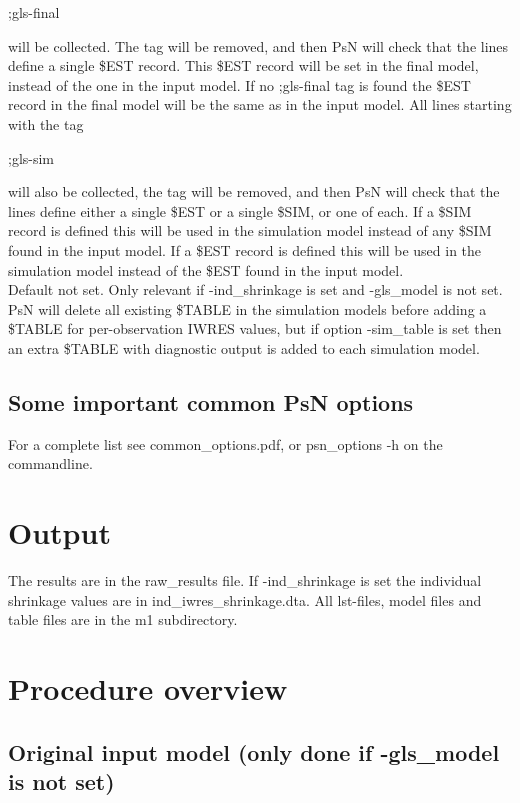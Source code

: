 \begin{optionlist}
;gls-final

will be collected. The tag will be removed, and then PsN will check that the lines define a single \$EST record. This \$EST record will be set in the final 
model, instead of the one in the input model. If no ;gls-final tag is found the \$EST record in the final model will be the same as in the input model. 
All lines starting with the tag

;gls-sim

will also be collected, the tag will be removed, and then PsN will check that the lines define either a single \$EST or a single \$SIM, or one of each. 
If a \$SIM record is defined this will be used in the simulation model instead of any \$SIM found in the input model. If a \$EST record is defined this 
will be used in the simulation model instead of the \$EST found in the input model.\\
\nextopt
{}
Default not set. Only relevant if -ind\_shrinkage is set and -gls\_model is not set. PsN will delete all existing \$TABLE in the simulation models before 
adding a \$TABLE for per-observation IWRES values, but if option -sim\_table is set then an extra \$TABLE with diagnostic output is added to each 
simulation model. 
\nextopt
\end{optionlist}

\subsection{Some important common PsN options}
For a complete list see common\_options.pdf, 
or psn\_options -h on the commandline.


\section{Output}

The results are in the raw\_results file. If -ind\_shrinkage is set the individual shrinkage values are in ind\_iwres\_shrinkage.dta. All lst-files, model files and table files are in the m1 subdirectory.

\section{Procedure overview}

\subsection{Original input model (only done if -gls\_model is not set)}

